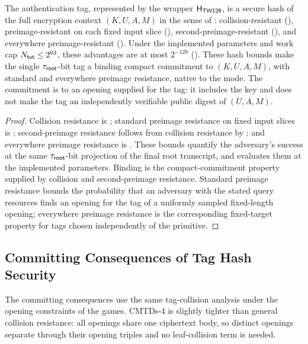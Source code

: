 \begin{corollary}
\label{cor:tag-commitment}
The \TW{} authentication tag, represented by the wrapper $\mathsf{H}_{\mathsf{TW128}}$, is a secure
hash of the full encryption context $(K, U, A, M)$ in the sense of
\cite{RS04}: collision-resistant
(), preimage-resistant on each fixed input slice
(), second-preimage-resistant
(), and everywhere preimage-resistant
(). Under the implemented
parameters and work cap $N_{\mathsf{tot}} \leq 2^{63}$, these advantages are at most
$2^{-128}$ (). These hash bounds make the
single $\tau_{\mathsf{root}}$-bit tag a binding compact commitment to $(K, U, A, M)$, with
standard and everywhere preimage resistance, native to the mode. The commitment
is to an opening supplied for the tag: it includes the key and does not make the
tag an independently verifiable public digest of $(U,A,M)$.
\end{corollary}

\begin{proof}
Collision resistance is ; standard preimage resistance on
fixed input slices is ; second-preimage resistance follows from
collision resistance by ; and everywhere
preimage resistance is . These bounds quantify the
adversary's success at the same $\tau_{\mathsf{root}}$-bit projection of the final root
transcript, and  evaluates them at the
implemented parameters. Binding is the compact-commitment property supplied
by collision and second-preimage resistance. Standard preimage resistance
bounds the probability that an adversary with the stated query
resources finds an opening for the tag of a uniformly sampled
fixed-length opening; everywhere preimage
resistance is the corresponding fixed-target property for tags chosen
independently of the primitive.
\end{proof}

\subsection{Committing Consequences of Tag Hash Security}

The committing consequences use the same tag-collision analysis under the
opening constraints of the \cite{BH22} games. CMTDs-4 is slightly tighter than
general collision resistance: all openings share one ciphertext body, so
distinct openings separate through their opening triples and no leaf-collision
term is needed.

